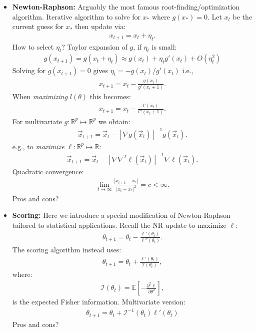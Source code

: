 \documentclass[11pt]{article}
\begin{document}
\begin{itemize}
\item \textbf{Newton-Raphson:} Arguably the most famous root-finding/optimization algorithm. Iterative algorithm to solve for $x_{*}$ where $g(x_{*})=0$. Let $x_{t}$ be the current guess for $x_{*}$ then update via:
\begin{align*}
 x_{t+1} = x_{t} + \eta_{t} .
\end{align*} 
How to select $\eta_{t}$? Taylor expansion of $g$, if $\eta_{t}$ is small:
\begin{align*}
 g(x_{t+1}) = g(x_{t}+\eta_{t}) \approx g(x_{t}) + \eta_{t}g'(x_{t}) + O(\eta_{t}^{2})
\end{align*}
Solving for $g(x_{t+1})=0$ gives $\eta_{t}=-g(x_{t})/g'(x_{t})$ i.e.,
\begin{align*}
 x_{t+1} = x_{t} - \frac{g(x_{t})}{g'(x_{t}+1)} .
\end{align*}
When \emph{maximizing} $l(\theta)$ this becomes:
\begin{align*}
 x_{t+1} = x_{t} - \frac{l'(x_{t})}{l''(x_{t}+1)} .
\end{align*}
For multivariate $g:\mathbb{R}^{p}\mapsto{}\mathbb{R}^{p}$ we obtain:
\begin{align*}
 \vec{x}_{t+1} = \vec{x}_{t} - \left[\nabla{}g(\vec{x}_{t})\right]^{-1}g(\vec{x}_{t}) .
 \end{align*}
 e.g., to \emph{maximize} $\ell:\mathbb{R}^{p}\mapsto{}\mathbb{R}$: 
\begin{align*}
 \vec{x}_{t+1} = \vec{x}_{t} - \left[\nabla{}\nabla^{T}\ell(\vec{x}_{t})\right]^{-1}\nabla{}\ell(\vec{x}_{t}) .
\end{align*}
Quadratic convergence:
\begin{align*}
 \lim_{t\rightarrow\infty} \frac{|x_{t+1}-x_{*}|}{|x_{t}-x_{*}|^{2}} = c < \infty .
\end{align*}
 Pros and cons?
 
 \item \textbf{Scoring:} Here we introduce a special modification of Newton-Raphson tailored to statistical applications. Recall the NR update to maximize $\ell$:
\begin{align*}
 \theta_{t+1} = \theta_{t} - \frac{\ell{}'(\theta_{t})}{\ell{}''(\theta_{t})} .
\end{align*}
The scoring algorithm instead uses:
\begin{align*}
 \theta_{t+1} = \theta_{t} + \frac{\ell{}'(\theta_{t})}{\mathcal{I}(\theta_{t})} ,
\end{align*}
where:
\begin{align*}
\mathcal{I}(\theta_{t}) = \mathbb{E}\left[-\frac{\partial^{2}\ell}{\partial{}\theta^{2}}\right] ,
\end{align*}
 is the expected Fisher information. Multivariate version:
\begin{align*}
 \theta_{t+1} = \theta_{t} + \mathcal{I}^{-1}(\theta_{t})\ell{}'(\theta_{t})
\end{align*}
Pros and cons?


\end{itemize}
\end{document}
